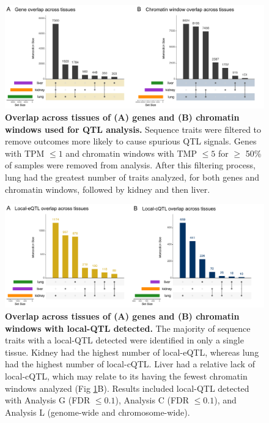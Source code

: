 \documentclass[10pt,letterpaper,twoside]{article}
\begin{document}
\clearpage

\begin{figure}[hp]
\renewcommand{\familydefault}{\sfdefault}\normalfont
\centering
\includegraphics[width=\textwidth, trim={0in 0in 0in 0in}, clip]{figs/upset_genes_chromatin.pdf}
\caption{\textbf{Overlap across tissues of (A) genes and (B) chromatin windows used for QTL analysis.} 
Sequence traits were filtered to remove outcomes more likely to cause spurious QTL signals. Genes with TPM $\le 1$ and chromatin windows with TMP $\le 5$ for $\ge$ 50\% of samples were removed from analysis. After this filtering process, lung had the greatest number of traits analyzed, for both genes and chromatin windows, followed by kidney and then liver. 
\label{fig:upset_genes_chromatin}}
\end{figure}

\clearpage

\begin{figure}[hp]
\renewcommand{\familydefault}{\sfdefault}\normalfont
\centering
\includegraphics[width=\textwidth, trim={0in 0in 0in 0in}, clip]{figs/upset_eqtl_cqtl.pdf}
\caption{\textbf{Overlap across tissues of (A) genes and (B) chromatin windows with local-QTL detected.} 
The majority of sequence traits with a local-QTL detected were identified in only a single tissue. Kidney had the highest number of local-eQTL, whereas lung had the highest number of local-cQTL. Liver had a relative lack of local-cQTL, which may relate to its having the fewest chromatin windows analyzed (Fig \ref{fig:upset_genes_chromatin}B). Results included local-QTL detected with Analysis G (FDR $\le 0.1$), Analysis C (FDR $\le 0.1$), and Analysis L (genome-wide and chromosome-wide). 
\label{fig:upset_eqtl_cqtl}}
\end{figure}
\end{document}
